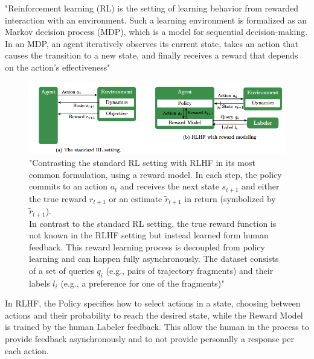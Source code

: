 \documentclass[12pt]{article}
\begin{document}
"Reinforcement learning (RL)\cite{ReinforcementLearningAnIntroduction} is the setting of learning behavior from rewarded interaction with an environment. Such a learning environment is formalized as an Markov decision process (MDP), which is a model for sequential decision-making. In an MDP, an agent iteratively observes its current state, takes an action that causes the transition to a new state, and finally receives a reward that depends on the action’s effectiveness"\cite{kaufmann2024surveyreinforcementlearninghuman}
    \begin{figure}[H]
    \centering
            \includegraphics[width=1\textwidth]{RL_and_RLHF.png}
    \caption{"Contrasting the standard RL setting with RLHF in its most common formulation, using a reward model. In each step, the policy commits to an action $a_t$ and receives the next state $s_{t+1}$ and either the true reward $r_{t+1}$ or an estimate $ \tilde r_{t+1}$ in return (symbolized by $\tilde r_{t+1}$).\\ In contrast to the standard RL setting, the true reward function is not known in the RLHF setting but instead learned form human feedback. This reward learning process is decoupled from policy learning and can happen fully asynchronously. The dataset consists of a set of queries $q_i$ (e.g., pairs of trajectory fragments) and their labels $l_i$ (e.g., a preference for one of the fragments)"\cite{kaufmann2024surveyreinforcementlearninghuman}}
    \end{figure}
\noindent In RLHF, the Policy specifies how to select actions in a state, choosing between actions and their probability to reach the desired state, while the Reward Model is trained by the human Labeler feedback. This allow the human in the process to provide feedback asynchronously and to not provide personally a response per each action.\cite{kaufmann2024surveyreinforcementlearninghuman}\\
\end{document}
